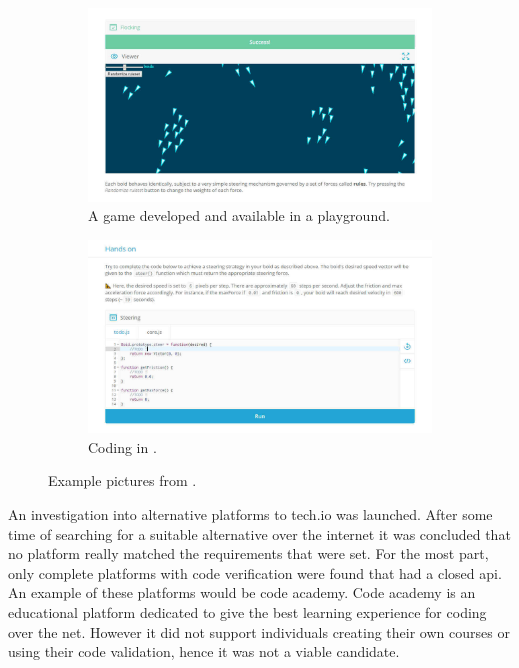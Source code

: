 \begin{figure}[h]
    \begin{subfigure}{.45\linewidth}
        \includegraphics[width=\linewidth]{img/techio_game.jpg}
        \caption{A game developed and available in a \techio{} playground.}
    \end{subfigure}
    \hfill
    \begin{subfigure}{.45\linewidth}
        \includegraphics[width=\linewidth]{img/techio_handson.jpg}
        \caption{Coding in \techio.}
    \end{subfigure}
    \caption{Example pictures from \techio.}
\end{figure}

An investigation into alternative platforms to tech.io was launched. After some time of searching for a suitable alternative over the internet it was concluded that no platform really matched the requirements that were set. For the most part, only complete platforms with code verification were found that had a closed api. An example of these platforms would be code academy.
Code academy is an educational platform dedicated to give the best learning experience for coding over the net. However it did not support individuals creating their own courses or using their code validation, hence it was not a viable candidate.

